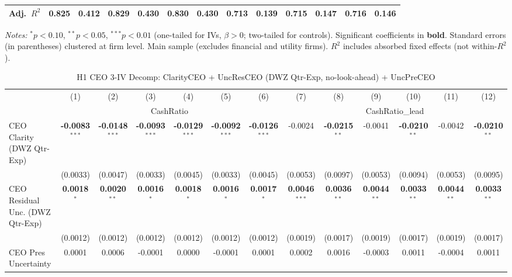 \documentclass[11pt,a4paper]{article}
\begin{document}
\begin{table}[htbp]
\begin{tabular}{lcccccccccccc}
Adj.~$R^2$ & 0.825 & 0.412 & 0.829 & 0.430 & 0.830 & 0.430 & 0.713 & 0.139 & 0.715 & 0.147 & 0.716 & 0.146 \\
\bottomrule
\end{tabular}
\begin{minipage}{\linewidth}
\vspace{2pt}\scriptsize
\textit{Notes:} $^{*}p<0.10$, $^{**}p<0.05$, $^{***}p<0.01$ (one-tailed for IVs, $\beta > 0$; two-tailed for controls).
 Significant coefficients in \textbf{bold}.
 Standard errors (in parentheses) clustered at firm level.
 Main sample (excludes financial and utility firms).
 $R^2$ includes absorbed fixed effects (not within-$R^2$).
\end{minipage}
\end{table}
\clearpage
\begin{table}[htbp]
\centering
\caption{H1 CEO 3-IV Decomp: ClarityCEO + UncResCEO (DWZ Qtr-Exp, no-look-ahead) + UncPreCEO}
\label{tab:h1_ceo2_decomp_qtrexp}
\scriptsize
\begin{tabular}{lcccccccccccc}
\toprule
 & (1) & (2) & (3) & (4) & (5) & (6) & (7) & (8) & (9) & (10) & (11) & (12) \\
 & \multicolumn{6}{c}{CashRatio} & \multicolumn{6}{c}{CashRatio\_lead} \\
\cmidrule(lr){2-7} \cmidrule(lr){8-13}
\midrule
CEO Clarity (DWZ Qtr-Exp) & \textbf{-0.0083}$^{***}$ & \textbf{-0.0148}$^{***}$ & \textbf{-0.0093}$^{***}$ & \textbf{-0.0129}$^{***}$ & \textbf{-0.0092}$^{***}$ & \textbf{-0.0126}$^{***}$ & -0.0024 & \textbf{-0.0215}$^{**}$ & -0.0041 & \textbf{-0.0210}$^{**}$ & -0.0042 & \textbf{-0.0210}$^{**}$ \\
 & (0.0033) & (0.0047) & (0.0033) & (0.0045) & (0.0033) & (0.0045) & (0.0053) & (0.0097) & (0.0053) & (0.0094) & (0.0053) & (0.0095) \\
CEO Residual Unc. (DWZ Qtr-Exp) & \textbf{0.0018}$^{*}$ & \textbf{0.0020}$^{**}$ & \textbf{0.0016}$^{*}$ & \textbf{0.0018}$^{*}$ & \textbf{0.0016}$^{*}$ & \textbf{0.0017}$^{*}$ & \textbf{0.0046}$^{***}$ & \textbf{0.0036}$^{**}$ & \textbf{0.0044}$^{**}$ & \textbf{0.0033}$^{**}$ & \textbf{0.0044}$^{**}$ & \textbf{0.0033}$^{**}$ \\
 & (0.0012) & (0.0012) & (0.0012) & (0.0012) & (0.0012) & (0.0012) & (0.0019) & (0.0017) & (0.0019) & (0.0017) & (0.0019) & (0.0017) \\
CEO Pres Uncertainty & 0.0001 & 0.0006 & -0.0001 & 0.0000 & -0.0001 & 0.0001 & 0.0002 & 0.0016 & -0.0003 & 0.0011 & -0.0004 & 0.0011 \\

\end{tabular}
\end{table}
\end{document}

